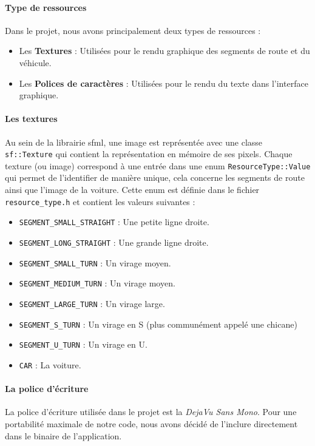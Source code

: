 \paragraph{Type de ressources}
Dans le projet, nous avons principalement deux types de ressources :
\begin{itemize}
    \item Les \textbf{Textures} : Utilisées pour le rendu graphique des segments de route et du véhicule.
    \item Les \textbf{Polices de caractères} : Utilisées pour le rendu du texte dans l'interface graphique.
\end{itemize}

\paragraph{Les textures}
Au sein de la librairie \gls{sfml}, une image est représentée avec une classe \texttt{sf::Texture}\cite{sfml_sf_texture} qui contient la représentation en mémoire de ses pixels.
Chaque texture (ou image) correspond à une entrée dans une enum \texttt{ResourceType::Value} qui permet de l'identifier de manière unique, cela concerne les segments de route ainsi que l'image de la voiture.
Cette enum est définie dans le fichier \texttt{resource\_type.h} et contient les valeurs suivantes :
\begin{itemize}
    \item \texttt{SEGMENT\_SMALL\_STRAIGHT} : Une petite ligne droite.
    \item \texttt{SEGMENT\_LONG\_STRAIGHT} : Une grande ligne droite.
    \item \texttt{SEGMENT\_SMALL\_TURN} : Un virage moyen.
    \item \texttt{SEGMENT\_MEDIUM\_TURN} : Un virage moyen.
    \item \texttt{SEGMENT\_LARGE\_TURN} : Un virage large.
    \item \texttt{SEGMENT\_S\_TURN} : Un virage en S (plus communément appelé une chicane)
    \item \texttt{SEGMENT\_U\_TURN} : Un virage en U\@.
    \item \texttt{CAR} : La voiture.
\end{itemize}

\paragraph{La police d'écriture}
La police d'écriture utilisée dans le projet est la \textit{DejaVu Sans Mono}.
Pour une portabilité maximale de notre code, nous avons décidé de l'inclure directement dans le binaire de l'application.

